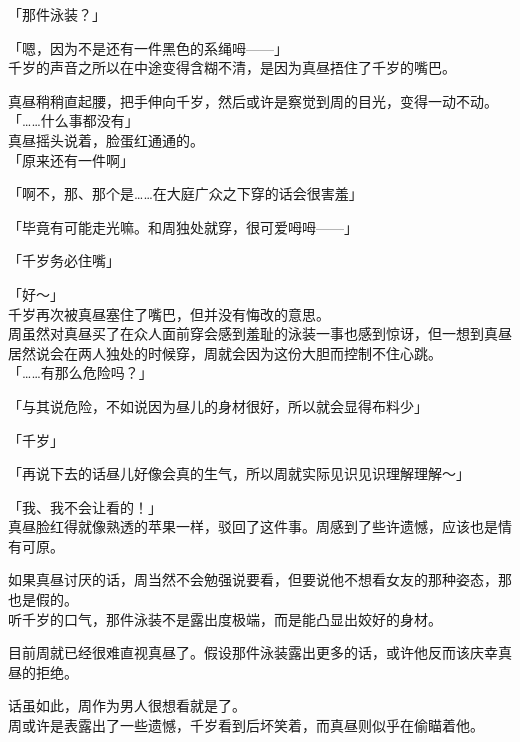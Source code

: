 「那件泳装？」

「嗯，因为不是还有一件黑色的系绳呣——」\\

千岁的声音之所以在中途变得含糊不清，是因为真昼捂住了千岁的嘴巴。

真昼稍稍直起腰，把手伸向千岁，然后或许是察觉到周的目光，变得一动不动。\\

「……什么事都没有」\\

真昼摇头说着，脸蛋红通通的。\\

「原来还有一件啊」

「啊不，那、那个是……在大庭广众之下穿的话会很害羞」

「毕竟有可能走光嘛。和周独处就穿，很可爱呣呣——」

「千岁务必住嘴」

「好～」\\

千岁再次被真昼塞住了嘴巴，但并没有悔改的意思。\\

周虽然对真昼买了在众人面前穿会感到羞耻的泳装一事也感到惊讶，但一想到真昼居然说会在两人独处的时候穿，周就会因为这份大胆而控制不住心跳。\\

「……有那么危险吗？」

「与其说危险，不如说因为昼儿的身材很好，所以就会显得布料少」

「千岁」

「再说下去的话昼儿好像会真的生气，所以周就实际见识见识理解理解～」

「我、我不会让看的！」\\

真昼脸红得就像熟透的苹果一样，驳回了这件事。周感到了些许遗憾，应该也是情有可原。

如果真昼讨厌的话，周当然不会勉强说要看，但要说他不想看女友的那种姿态，那也是假的。\\

听千岁的口气，那件泳装不是露出度极端，而是能凸显出姣好的身材。

目前周就已经很难直视真昼了。假设那件泳装露出更多的话，或许他反而该庆幸真昼的拒绝。

话虽如此，周作为男人很想看就是了。\\

周或许是表露出了一些遗憾，千岁看到后坏笑着，而真昼则似乎在偷瞄着他。\\

